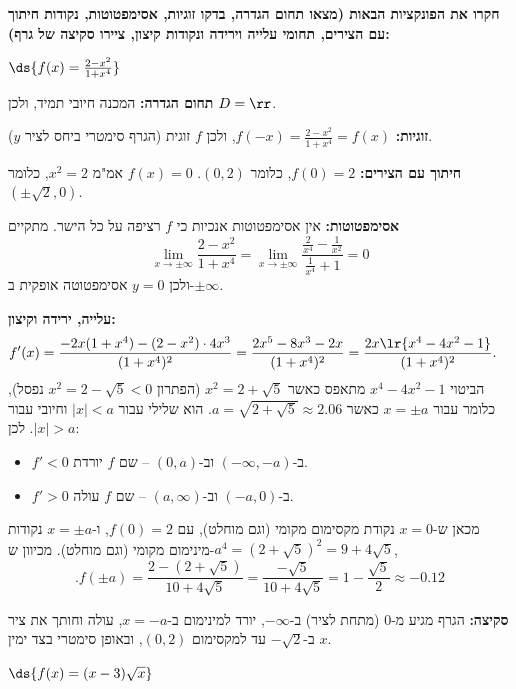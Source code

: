 \textbf{חקרו את הפונקציות הבאות (מצאו תחום הגדרה, בדקו זוגיות, אסימפטוטות, נקודות חיתוך עם
הצירים, תחומי עלייה וירידה ונקודות קיצון, ציירו סקיצה של גרף):}
\bE{}
\item $\ds{f(x) = \frac{2 - x^2}{1 + x^4}} $
\begin{solbox}
\unverified
\textbf{תחום הגדרה:}
המכנה חיובי תמיד, ולכן
$D=\rr$.

\textbf{זוגיות:}
$f(-x)=\frac{2-x^2}{1+x^4}=f(x)$,
ולכן
$f$
זוגית (הגרף סימטרי ביחס לציר
$y$).

\textbf{חיתוך עם הצירים:}
$f(0)=2$,
כלומר
$(0,2)$.
$f(x)=0$
אמ"מ
$x^2=2$,
כלומר
$(\pm\sqrt2,0)$.

\textbf{אסימפטוטות:}
אין אסימפטוטות אנכיות כי
$f$
רציפה על כל הישר. מתקיים
$$\lim_{x\to\pm\infty}\frac{2-x^2}{1+x^4}=\lim_{x\to\pm\infty}\frac{\frac{2}{x^4}-\frac{1}{x^2}}{\frac{1}{x^4}+1}=0$$
ולכן
$y=0$
אסימפטוטה אופקית ב-$\pm\infty$.

\textbf{עלייה, ירידה וקיצון:}
\begin{align*}
f'(x)&=\frac{-2x(1+x^4)-(2-x^2)\cdot 4x^3}{(1+x^4)^2}
=\frac{2x^5-8x^3-2x}{(1+x^4)^2}
=\frac{2x\lr{x^4-4x^2-1}}{(1+x^4)^2}.
\end{align*}
הביטוי
$x^4-4x^2-1$
מתאפס כאשר
$x^2=2+\sqrt5$
(הפתרון
$x^2=2-\sqrt5<0$
נפסל), כלומר עבור
$x=\pm a$
כאשר
$a=\sqrt{2+\sqrt5}\approx 2.06$.
הוא שלילי עבור
$|x|<a$
וחיובי עבור
$|x|>a$.
לכן:
\begin{itemize}
\item
$f'<0$
ב-$(-\infty,-a)$
וב-$(0,a)$
-- שם
$f$
יורדת.
\item
$f'>0$
ב-$(-a,0)$
וב-$(a,\infty)$
-- שם
$f$
עולה.
\end{itemize}
מכאן ש-$x=0$
נקודת מקסימום מקומי (וגם מוחלט), עם
$f(0)=2$,
ו-$x=\pm a$
נקודות מינימום מקומי (וגם מוחלט). מכיוון ש-$a^4=(2+\sqrt5)^2=9+4\sqrt5$,
$$.f(\pm a)=\frac{2-(2+\sqrt5)}{10+4\sqrt5}=\frac{-\sqrt5}{10+4\sqrt5}=1-\frac{\sqrt5}{2}\approx-0.12$$

\textbf{סקיצה:}
הגרף מגיע מ-$0$ (מתחת לציר) ב-$-\infty$, יורד למינימום ב-$x=-a$, עולה וחותך את ציר
$x$
ב-$-\sqrt2$
עד למקסימום
$(0,2)$,
ובאופן סימטרי בצד ימין.
\end{solbox}
\item $\ds{f(x) = (x - 3)\sqrt{x}}$

